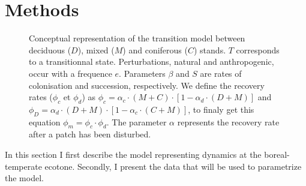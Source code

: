 

\section{Methods}   

\begin{figure}         
	
	\caption{Conceptual representation of the transition model between deciduous ($D$),
	mixed ($M$) and coniferous ($C$) stands. $T$ corresponds to a transitionnal state. 
	Perturbations, natural and anthropogenic,  occur with a frequence $e$. Parameters $\beta$
	and $S$ are rates of colonisation and succession,
	respectively. We define the recovery rates ($\phi_c$ et $\phi_d$) as $\phi_c
	= \alpha_c \cdot (M+C) \cdot [1- \alpha_d \cdot (D +M)]$ and $\phi_D =
	\alpha_d \cdot (D+M) \cdot [1- \alpha_c \cdot (C +M)]$, to finaly get this
	equation $\phi_m = \phi_c \cdot \phi_d$. The parameter $\alpha$ represents the 
	recovery rate after a patch has been disturbed.}         
	\label{Model}
\end{figure}

In this section I first describe the  model representing dynamics at the
boreal-temperate ecotone. Secondly, I present the  data that will be used to
parametrize the model.

